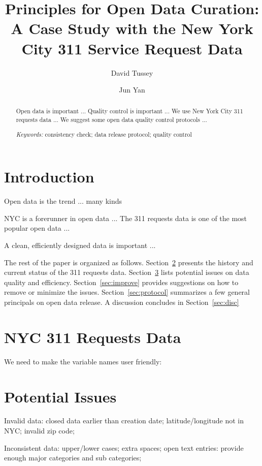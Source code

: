 \documentclass[12pt, titlepage]{article}
\title{Principles for Open Data Curation: A Case Study with the New
  York City 311 Service Request Data}
\author[1]{David Tussey}
\author[2]{Jun Yan}
\affil[1]{Former Executive Director, NYC DoITT}
\affil[2]{Department of Statistics, University of Connecticut}
\begin{document}
\maketitle


\begin{abstract}
  Open data is important ...
  Quality control is important ...
  We use New York City 311 requests data  ...
  We suggest some open data quality control protocols ...


\bigskip
  
\noindent
{\it Keywords:}
consistency check;    
data release protocol;
quality control
\end{abstract}

\doublespacing

\section{Introduction} \label{sec:intro}

Open data is the trend ... many kinds \citep{barns2016mine}


NYC is a forerunner in open data ... The 311 requests data is one of the most
popular open data ...


A clean, efficiently designed data is important ...


The rest of the paper is organized as follows.
Section~\ref{sec:data} presents the history and current status of the 311
requests data. Section~\ref{sec:issues} lists potential issues on data quality
and efficiency.
Section~\ref{sec:improve} provides suggestions on how to remove or minimize the
issues.
Section~\ref{sec:protocol} summarizes a few general principals on open data
release.
A discussion concludes in Section~\ref{sec:disc}


\section{NYC 311 Requests Data} \label{sec:data}

We need to make the variable names user friendly:


\section{Potential Issues} \label{sec:issues}

Invalid data: closed data earlier than creation date;
latitude/longitude not in NYC; invalid zip code;


Inconsistent data: upper/lower cases; extra spaces; 
open text entries: provide enough major categories and sub categories;
\end{document}
